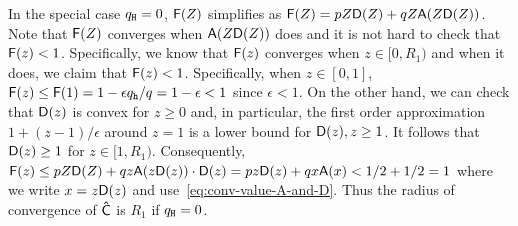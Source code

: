   In the special case $q_{\mathtt{H}} = 0$, 
  $\mathsf{F}(Z)$ simplifies as $\mathsf{F}(Z) = pZ \mathsf{D}(Z) + q  Z \mathsf{A}(Z \mathsf{D}(Z) )$. 
  Note that $\mathsf{F}(Z)$ converges when $\mathsf{A}(Z \mathsf{D}(Z) )$ does 
  and it is not hard to check that $\mathsf{F}(z) < 1$. 
  Specifically, 
  we know that $\mathsf{F}(z)$ converges when $z \in[0, R_1)$ 
  and when it does, we claim that $\mathsf{F}(z) < 1$. 
  Specifically, when $z \in [0, 1]$, 
  $\mathsf{F}(z) \leq \mathsf{F}(1) = 1 - \epsilon q_{\mathtt{h}}/q = 1 - \epsilon < 1$ since $\epsilon < 1$. 
  On the other hand, 
  we can check that $\mathsf{D}(z)$ is convex for $z \geq 0$ and, 
  in particular, the first order approximation $1 + (z-1)/\epsilon$ around $z = 1$ 
  is a lower bound for $\mathsf{D}(z), z \geq 1$.
  It follows that $\mathsf{D}(z) \geq 1$ for $z \in [1, R_1)$. 
  Consequently, 
  $\mathsf{F}(z) 
  \leq pZ \mathsf{D}(Z) + q  z \mathsf{A}(z \mathsf{D}(z) )\cdot \mathsf{D}(z) 
  = pz \mathsf{D}(z) + q  x \mathsf{A}(x) 
  < 1/2 + 1/2 = 1$ 
  where we write $x = z \mathsf{D}(z)$ and use~\eqref{eq:conv-value-A-and-D}. 
  Thus 
  the radius of convergence of $\mathsf{\hat{C}}$ is $R_1$ if $q_{\mathtt{H}} = 0$.

